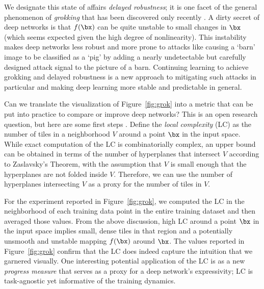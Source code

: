 \documentclass{notices}
\begin{document}
We designate this state of affairs {\em delayed robustness}; it is one facet of the general phenomenon of {\em grokking} that has been discovered only recently \cite{power2022grokking}.
A dirty secret of deep networks is that $f(\bx)$ can be quite unstable to small changes in $\bx$ (which seems expected given the high degree of nonlinearity).
This instability makes deep networks less robust and more prone to attacks like causing a `barn' image to be classified as a `pig' by adding a nearly undetectable but carefully designed attack signal to the picture of a barn.
Continuing learning to achieve grokking and delayed robustness is a new approach to mitigating such attacks in particular and making deep learning more stable and predictable in general.




Can we translate the visualization of Figure~\ref{fig:grok} into a metric that can be put into practice to compare or improve deep networks?
This is an open research question, but here are some first steps \cite{alwaysgrok}. 
Define the {\em local complexity} (LC) as the number of tiles in a neighborhood $V$ around a point $\bx$ in the input space. 
While exact computation of the LC is combinatorially complex, an upper bound can be obtained in terms of the number of hyperplanes that intersect $V$ according to Zaslavsky’s Theorem, with the assumption that $V$ is small enough that the hyperplanes are not folded inside $V$. 
Therefore, we can use the number of hyperplanes intersecting $V$ as a proxy for the number of tiles in $V$.


For the experiment reported in Figure~\ref{fig:grok}, we computed the LC in the neighborhood of each training data point in the entire training dataset and then averaged those values.
From the above discussion, high LC around a point $\bx$ in the input space implies small, dense tiles in that region and a potentially unsmooth and unstable mapping $f(\bx)$ around $\bx$.
The values reported in Figure~\ref{fig:grok} confirm that the LC does indeed capture the intuition that we garnered visually.
One interesting potential application of the LC is as a new {\em progress measure} that serves as a proxy for a deep  network's expressivity; LC is task-agnostic yet informative of the training dynamics.
\end{document}
